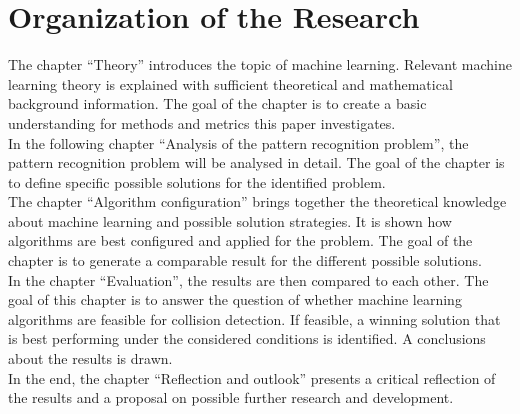 \section{Organization of the Research}
The chapter ``Theory'' introduces the topic of machine learning. Relevant machine learning theory is explained with sufficient theoretical and mathematical background information. The goal of the chapter is to create a basic understanding for methods and metrics this paper investigates.
\\
In the following chapter ``Analysis of the pattern recognition problem'', the pattern recognition problem will be analysed in detail. The goal of the chapter is to define specific possible solutions for the identified problem. 
\\
The chapter ``Algorithm configuration'' brings together the theoretical knowledge about machine learning and possible solution strategies. It is shown how algorithms are best configured and applied for the problem. The goal of the chapter is to generate a comparable result for the different possible solutions. 
\\
In the chapter ``Evaluation'', the results are then compared to each other. The goal of this chapter is to answer the question of whether machine learning algorithms are feasible for collision detection. If feasible, a winning solution that is best performing under the considered conditions is identified. A conclusions about the results is drawn. \\
In the end, the chapter ``Reflection and outlook'' presents a critical reflection of the results and a proposal on possible further research and development.